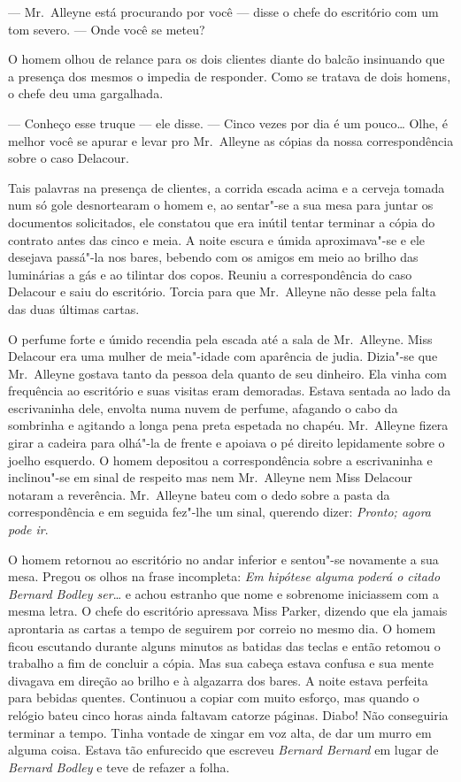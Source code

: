 --- Mr.~Alleyne está procurando por você --- disse o chefe do escritório com um
tom severo.  --- Onde você se meteu?

O homem olhou de relance para os dois clientes diante do balcão insinuando que
a presença dos mesmos o impedia de responder.  Como se tratava de dois homens,
o chefe deu uma gargalhada.

--- Conheço esse truque --- ele disse.  --- Cinco vezes por dia é um
pouco\ldots{} Olhe, é melhor você se apurar e levar pro Mr.~Alleyne as cópias
da nossa correspondência sobre o caso Delacour.

Tais palavras na presença de clientes, a corrida escada acima e a cerveja
tomada num só gole desnortearam o homem e, ao sentar"-se a sua mesa para juntar
os documentos solicitados, ele constatou que era inútil tentar terminar a cópia
do contrato antes das cinco e meia.  A noite escura e úmida aproximava"-se e ele
desejava passá"-la nos bares, bebendo com os amigos em meio ao brilho das
luminárias a gás e ao tilintar dos copos.  Reuniu a correspondência do caso
Delacour e saiu do escritório.  Torcia para que Mr.~Alleyne não desse pela
falta das duas últimas cartas.

O perfume forte e úmido recendia pela escada até a sala de Mr.~Alleyne.  Miss
Delacour era uma mulher de meia"-idade com aparência de judia.  Dizia"-se que Mr.~Alleyne 
gostava tanto da pessoa dela quanto de seu dinheiro.  Ela vinha com
frequência ao escritório e suas visitas eram demoradas.  Estava sentada ao lado
da escrivaninha dele, envolta numa nuvem de perfume, afagando o cabo da
sombrinha e agitando a longa pena preta espetada no chapéu.  Mr.~Alleyne fizera
girar a cadeira para olhá"-la de frente e apoiava o pé direito lepidamente sobre
o joelho esquerdo.  O homem depositou a correspondência sobre a escrivaninha e
inclinou"-se em sinal de respeito mas nem Mr.~Alleyne nem Miss Delacour notaram
a reverência.  Mr.~Alleyne bateu com o dedo sobre a pasta da correspondência e
em seguida fez"-lhe um sinal, querendo dizer: \textit{Pronto; agora pode
ir}.

O homem retornou ao escritório no andar inferior e sentou"-se novamente a sua
mesa.  Pregou os olhos na frase incompleta: \textit{Em hipótese alguma poderá o
citado Bernard Bodley ser}\ldots{} e achou estranho que nome e sobrenome
iniciassem com a mesma letra.  O chefe do escritório apressava Miss Parker,
dizendo que ela jamais aprontaria as cartas a tempo de seguirem por correio no
mesmo dia.  O homem ficou escutando durante alguns minutos as batidas das
teclas e então retomou o trabalho a fim de concluir a cópia.  Mas sua cabeça
estava confusa e sua mente divagava em direção ao brilho e à algazarra dos
bares.  A noite estava perfeita para bebidas quentes.  Continuou a copiar com
muito esforço, mas quando o relógio bateu cinco horas ainda faltavam catorze
páginas.  Diabo!  Não conseguiria terminar a tempo.  Tinha vontade de xingar em
voz alta, de dar um murro em alguma coisa.  Estava tão enfurecido que escreveu
\textit{Bernard Bernard} em lugar de \textit{Bernard Bodley} e teve de
refazer a folha.

